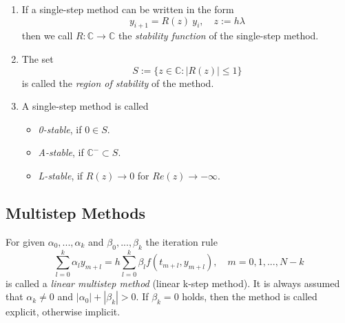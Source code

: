 	\begin{frame}
		\begin{definition}
			\begin{enumerate}
				\item 
				If a single-step method can be written in the form
				\begin{equation}
					y_{i+1} = R(z) \ y_i, \quad z:= h \lambda
				\end{equation}
				then we call $R: \mathbb{C} \to \mathbb{C}$ the \emph{stability function} of the single-step method.
				\item 
				The set
				\begin{equation}
					S := \{z \in \mathbb{C} : |R(z)| \leq 1\}
				\end{equation}
				is called the \emph{region of stability} of the method.
				\item 
				A single-step method is called
				\begin{itemize}
					\item \emph{0-stable}, if $0 \in S$.
					\item \emph{A-stable}, if $\mathbb{C}^- \subset S$.
					\item \emph{L-stable}, if $R(z) \to 0$ for $Re(z) \to -\infty$.
				\end{itemize}
			\end{enumerate}
		\end{definition}
	\end{frame}
	
	\subsection{Multistep Methods}
	\begin{frame}
		\begin{definition}
			\label{def:multi step method}
			For given $\alpha_0, ..., \alpha_k$ and $\beta_0, ..., \beta_k$ the iteration rule
			\begin{equation}
				\label{linear-multistep-method}
				\sum_{l=0}^{k} \alpha_l y_{m+l} = h \sum_{l=0}^{k} \beta_l f(t_{m+l}, y_{m+l}), \quad m=0,1,...,N-k
			\end{equation}
			is called a \emph{linear multistep method} (linear k-step method). It is always assumed that $\alpha_k \neq 0$ and $|\alpha_0| + |\beta_k| > 0$. If $\beta_k=0$ holds, then the method is called explicit, otherwise implicit.
		\end{definition}
	\end{frame}
	
